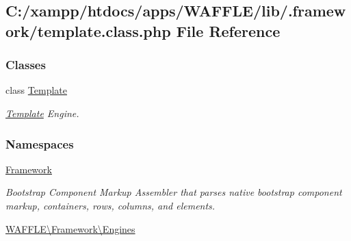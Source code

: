 \hypertarget{template_8class_8php}{}\subsection{C\+:/xampp/htdocs/apps/\+W\+A\+F\+F\+L\+E/lib/.framework/template.class.\+php File Reference}
\label{template_8class_8php}
\subsubsection*{Classes}
\begin{DoxyCompactItemize}
\item 
class \hyperlink{class_w_a_f_f_l_e_1_1_framework_1_1_engines_1_1_template}{Template}
\begin{DoxyCompactList}\small\item\em \hyperlink{class_w_a_f_f_l_e_1_1_framework_1_1_engines_1_1_template}{Template} Engine. \end{DoxyCompactList}\end{DoxyCompactItemize}
\subsubsection*{Namespaces}
\begin{DoxyCompactItemize}
\item 
 \hyperlink{namespace_framework}{Framework}
\begin{DoxyCompactList}\small\item\em Bootstrap Component Markup Assembler that parses native bootstrap component markup, containers, rows, columns, and elements. \end{DoxyCompactList}\item 
 \hyperlink{namespace_w_a_f_f_l_e_1_1_framework_1_1_engines}{W\+A\+F\+F\+L\+E\textbackslash{}\+Framework\textbackslash{}\+Engines}
\end{DoxyCompactItemize}
